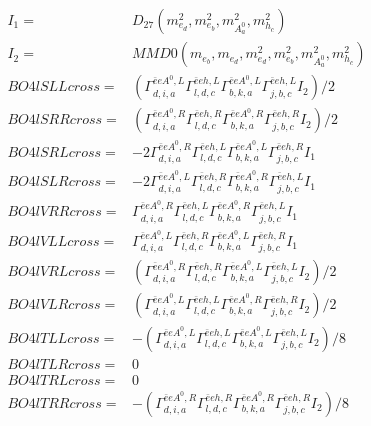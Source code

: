 \documentclass[A4,landscape]{article}
\begin{document}
\begin{align} 
I_1 = & D_{27}(m^2_{e_{{d}}}, m^2_{e_{{b}}}, m^2_{A^0_{{a}}}, m^2_{h_{{c}}}) \\ 
I_2 = & MMD0(m_{e_{{b}}}, m_{e_{{d}}}, m^2_{e_{{d}}}, m^2_{e_{{b}}}, m^2_{A^0_{{a}}}, m^2_{h_{{c}}}) \\ 
  BO4lSLLcross= & ( \Gamma^{\bar{e}e A^0 ,L}_{d, i, a} \Gamma^{\bar{e}e h ,L}_{l, d, c} \Gamma^{\bar{e}e A^0 ,L}_{b, k, a} \Gamma^{\bar{e}e h ,L}_{j, b, c} I_2)/2 \\ 
  BO4lSRRcross= & ( \Gamma^{\bar{e}e A^0 ,R}_{d, i, a} \Gamma^{\bar{e}e h ,R}_{l, d, c} \Gamma^{\bar{e}e A^0 ,R}_{b, k, a} \Gamma^{\bar{e}e h ,R}_{j, b, c} I_2)/2 \\ 
  BO4lSRLcross= & -2  \Gamma^{\bar{e}e A^0 ,R}_{d, i, a} \Gamma^{\bar{e}e h ,L}_{l, d, c} \Gamma^{\bar{e}e A^0 ,L}_{b, k, a} \Gamma^{\bar{e}e h ,R}_{j, b, c} I_1 \\ 
  BO4lSLRcross= & -2  \Gamma^{\bar{e}e A^0 ,L}_{d, i, a} \Gamma^{\bar{e}e h ,R}_{l, d, c} \Gamma^{\bar{e}e A^0 ,R}_{b, k, a} \Gamma^{\bar{e}e h ,L}_{j, b, c} I_1 \\ 
  BO4lVRRcross= &  \Gamma^{\bar{e}e A^0 ,R}_{d, i, a} \Gamma^{\bar{e}e h ,L}_{l, d, c} \Gamma^{\bar{e}e A^0 ,R}_{b, k, a} \Gamma^{\bar{e}e h ,L}_{j, b, c} I_1 \\ 
  BO4lVLLcross= &  \Gamma^{\bar{e}e A^0 ,L}_{d, i, a} \Gamma^{\bar{e}e h ,R}_{l, d, c} \Gamma^{\bar{e}e A^0 ,L}_{b, k, a} \Gamma^{\bar{e}e h ,R}_{j, b, c} I_1 \\ 
  BO4lVRLcross= & ( \Gamma^{\bar{e}e A^0 ,R}_{d, i, a} \Gamma^{\bar{e}e h ,R}_{l, d, c} \Gamma^{\bar{e}e A^0 ,L}_{b, k, a} \Gamma^{\bar{e}e h ,L}_{j, b, c} I_2)/2 \\ 
  BO4lVLRcross= & ( \Gamma^{\bar{e}e A^0 ,L}_{d, i, a} \Gamma^{\bar{e}e h ,L}_{l, d, c} \Gamma^{\bar{e}e A^0 ,R}_{b, k, a} \Gamma^{\bar{e}e h ,R}_{j, b, c} I_2)/2 \\ 
  BO4lTLLcross= & -( \Gamma^{\bar{e}e A^0 ,L}_{d, i, a} \Gamma^{\bar{e}e h ,L}_{l, d, c} \Gamma^{\bar{e}e A^0 ,L}_{b, k, a} \Gamma^{\bar{e}e h ,L}_{j, b, c} I_2)/8 \\ 
  BO4lTLRcross= & 0 \\ 
  BO4lTRLcross= & 0 \\ 
  BO4lTRRcross= & -( \Gamma^{\bar{e}e A^0 ,R}_{d, i, a} \Gamma^{\bar{e}e h ,R}_{l, d, c} \Gamma^{\bar{e}e A^0 ,R}_{b, k, a} \Gamma^{\bar{e}e h ,R}_{j, b, c} I_2)/8 \\ 
\end{align} 
\end{document}
